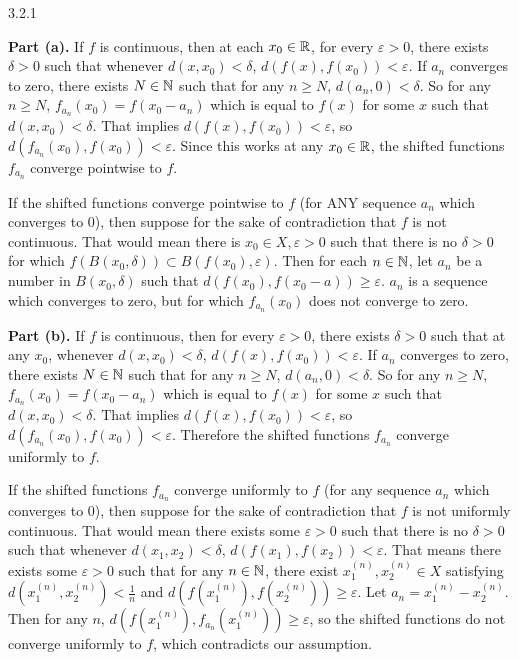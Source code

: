 \documentclass{article}
\begin{document}
\bigskip
\begin{prob}
    3.2.1
\end{prob}
\textbf{Part (a).} If $f$ is continuous, then at each $x_0 \in \mathbb{R}$, for every $\varepsilon > 0$, there exists $\delta > 0$ such that whenever $d(x, x_0) < \delta$, $d(f(x), f(x_0)) < \varepsilon$. If $a_n$ converges to zero, there exists $N \in \mathbb{N}$ such that for any $n \geq N$, $d(a_n, 0) < \delta$. So for any $n \geq N$, $f_{a_n}(x_0) = f(x_0 - a_n)$ which is equal to $f(x)$ for some $x$ such that $d(x, x_0) < \delta$. That implies $d(f(x), f(x_0)) < \varepsilon$, so $d(f_{a_n}(x_0), f(x_0)) < \varepsilon$. Since this works at any $x_0 \in \mathbb{R}$, the shifted functions $f_{a_n}$ converge pointwise to $f$.
\par
If the shifted functions converge pointwise to $f$ (for ANY sequence $a_n$ which converges to 0), then suppose for the sake of contradiction that $f$ is not continuous. That would mean there is $x_0 \in X, \varepsilon > 0$ such that there is no $\delta > 0$ for which $f(B(x_0, \delta)) \subset B(f(x_0), \varepsilon)$. Then for each $n \in \mathbb{N}$, let $a_n$ be a number in $B(x_0, \delta)$ such that $d(f(x_0), f(x_0-a)) \geq \varepsilon$. $a_n$ is a sequence which converges to zero, but for which $f_{a_n}(x_0)$ does not converge to zero.
\par
\textbf{Part (b).} If $f$ is continuous, then for every $\varepsilon > 0$, there exists $\delta > 0$ such that at any $x_0$, whenever $d(x, x_0) < \delta$, $d(f(x), f(x_0)) < \varepsilon$. If $a_n$ converges to zero, there exists $N \in \mathbb{N}$ such that for any $n \geq N$, $d(a_n, 0) < \delta$. So for any $n \geq N$, $f_{a_n}(x_0) = f(x_0 - a_n)$ which is equal to $f(x)$ for some $x$ such that $d(x, x_0) < \delta$. That implies $d(f(x), f(x_0)) < \varepsilon$, so $d(f_{a_n}(x_0), f(x_0)) < \varepsilon$. Therefore the shifted functions $f_{a_n}$ converge uniformly to $f$.
\par
If the shifted functions $f_{a_n}$ converge uniformly to $f$ (for any sequence $a_n$ which converges to 0), then suppose for the sake of contradiction that $f$ is not uniformly continuous. That would mean there exists some $\varepsilon > 0$ such that there is no $\delta > 0$ such that whenever $d(x_1, x_2) < \delta$, $d(f(x_1), f(x_2)) < \varepsilon$. That means there exists some $\varepsilon > 0$ such that for any $n \in \mathbb{N}$, there exist $x^{(n)}_1, x^{(n)}_2 \in X$ satisfying $d(x^{(n)}_1, x^{(n)}_2) < \frac{1}{n}$ and $d(f(x^{(n)}_1), f(x^{(n)}_2)) \geq \varepsilon$. Let $a_n = x^{(n)}_1 - x^{(n)}_2$. Then for any $n$, $d(f(x^{(n)}_1), f_{a_n}(x^{(n)}_1)) \geq \varepsilon$, so the shifted functions do not converge uniformly to $f$, which contradicts our assumption.
\end{document}
